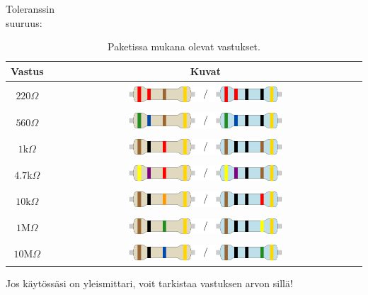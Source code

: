\begin{minipage}{0.2\textwidth}
Toleranssin\\ suuruus:

\end{minipage}


\begin{table}[!h]
\caption {Paketissa mukana olevat vastukset.} \label{tab:varikooditv} 
\begin{center}
\begin{tabular}{c|c}
    Vastus & Kuvat  \\\hline\\
   $220\Omega$  & \includegraphics[width=0.5\textwidth]{kuvat/220.pdf} \\\hline\\
   $560\Omega$  & \includegraphics[width=0.5\textwidth]{kuvat/560.pdf} \\\hline\\
   $1\text{k}\Omega$  & \includegraphics[width=0.5\textwidth]{kuvat/1k.pdf} \\\hline\\
   $4.7\text{k}\Omega$  & \includegraphics[width=0.5\textwidth]{kuvat/4k7.pdf} \\\hline\\
   $10\text{k}\Omega$  & \includegraphics[width=0.5\textwidth]{kuvat/10k.pdf} \\\hline\\
$1\text{M}\Omega$  & \includegraphics[width=0.5\textwidth]{kuvat/1M.pdf} \\\hline\\
   $10\text{M}\Omega$  & \includegraphics[width=0.5\textwidth]{kuvat/10M.pdf} \\\hline
\end{tabular}
\end{center}
\end{table}

\begin{tcolorbox}[colback=red!10,colbacktitle=red,title=HUOM!]
Jos käytössäsi on yleismittari, voit tarkistaa vastuksen arvon sillä!
\end{tcolorbox}
